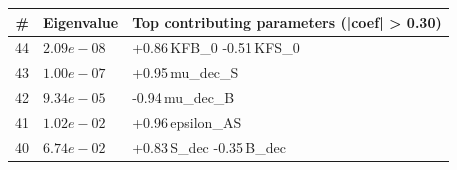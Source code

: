 \begin{tabular}{rlp{8cm}}
\toprule
\# & Eigenvalue & Top contributing parameters (|coef| > 0.30) \\
\midrule
44 & $2.09e-08$ & +0.86\,KFB\_0 -0.51\,KFS\_0 \\
43 & $1.00e-07$ & +0.95\,mu\_dec\_S \\
42 & $9.34e-05$ & -0.94\,mu\_dec\_B \\
41 & $1.02e-02$ & +0.96\,epsilon\_AS \\
40 & $6.74e-02$ & +0.83\,S\_dec -0.35\,B\_dec \\
\bottomrule
\end{tabular}